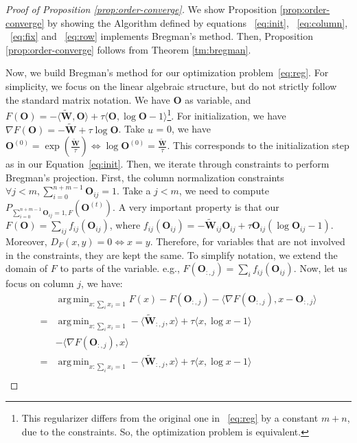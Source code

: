 \documentclass[11pt]{article}
\DeclareMathOperator*{\argmin}{arg\,min}
\begin{document}
\begin{proof}[Proof of Proposition \ref{prop:order-converge}]
We show Proposition \ref{prop:order-converge} by showing the Algorithm defined by equations ~\ref{eq:init}, ~\ref{eq:column}, ~\ref{eq:fix} and  ~\ref{eq:row} implements Bregman's method. Then, Proposition \ref{prop:order-converge}  follows from Theorem \ref{tm:bregman}.

Now, we build Bregman's method for our optimization problem~\ref{eq:reg}. For simplicity, we focus on the linear algebraic structure, but do not strictly follow the standard matrix notation. We have $\mathbf{O}$ as variable, and $F(\mathbf{O}) = - \langle \widetilde{ \mathbf{W}}, \mathbf{O} \rangle + \tau \langle \mathbf{O}, \log \mathbf{O} -1 \rangle$\footnote{This regularizer differs from the original one in ~\ref{eq:reg} by a constant $m+n$, due to the constraints. So, the optimization problem is equivalent.}. For initialization, we have $\nabla F( \mathbf{O}) =  -  \widetilde{ \mathbf{W}} +\tau  \log \mathbf{O}$. Take $u$ = 0, we have $\mathbf{O}^{(0)}= \exp (\frac{ \widetilde{ \mathbf{W}}}{\tau}) \iff \log \mathbf{O}^{(0)} = \frac{ \widetilde{ \mathbf{W}}}{\tau} $. This corresponds to the initialization step as in our Equation~\ref{eq:init}. Then, we iterate through constraints to perform Bregman's projection. First, the column normalization constraints $ \forall j < m, \sum_{i=0}^{n+m-1} \mathbf{O}_{ij} =1$. Take a $j<m$, we need to compute $P_{\sum_{i=0}^{n+m-1} \mathbf{O}_{ij} =1,F}(\mathbf{O}^(t))$. A very important property is that our $F( \mathbf{O})  =\sum_{ij} f_{ij}(\mathbf{O}_{ij})$, where $f_{ij}(\mathbf{O}_{ij}) = - \widetilde{ \mathbf{W}}_{ij}\mathbf{O}_{ij} +\tau \mathbf{O}_{ij} (\log \mathbf{O}_{ij} -1) $. Moreover, $D_F(x,y) = 0 \iff x=y$. Therefore, for variables that are not involved in the constraints, they are kept the same. To simplify notation, we extend the domain of $F$ to parts of the variable. e.g., $F(\mathbf{O}_{:,j} )=\sum_{i} f_{ij}(\mathbf{O}_{ij})$. Now, let us focus on column $j$, we have:
\begin{align}
   & \argmin_{x: \sum_i x_i =1 }  F(x) - F(\mathbf{O}_{:,j}) - \langle \nabla F(\mathbf{O}_{:,j} ) ,x-\mathbf{O}_{:,j} \rangle  \\
    = & \argmin_{x: \sum_i x_i =1 }   - \langle \widetilde{ \mathbf{W}}_{:,j}, x \rangle + \tau \langle x, \log x -1 \rangle   \nonumber \\
    &- \langle \nabla F(\mathbf{O}_{:,j} ) ,x \rangle \\
    = & \argmin_{x: \sum_i x_i =1 }   - \langle \widetilde{ \mathbf{W}}_{:,j}, x \rangle + \tau \langle x, \log x -1 \rangle   \nonumber\\

\end{align}
\end{proof}
\end{document}
